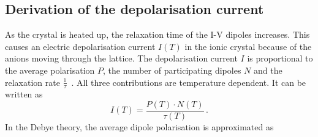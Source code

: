 \subsection{Derivation of the depolarisation current}
%
%
As the crystal is heated up, the relaxation time of the I-V dipoles increases. 
This causes an electric depolarisation current $I(T)$ in the ionic crystal because of the anions moving through the lattice. 
The depolarisation current $I$ is proportional to the average polarisation $P$, the number of participating dipoles $N$ and the relaxation rate $\frac{1}{\tau}$~\cite[2]{Fuller}.
All three contributions are temperature dependent.
It can be written as
\begin{equation}
I\left(T\right) = \frac{P\left(T\right)\cdot N\left(T\right)}{\tau\left(T\right)}\,. 
\label{eqn:current_prop}
\end{equation}
In the Debye theory, the average dipole polarisation is approximated as
